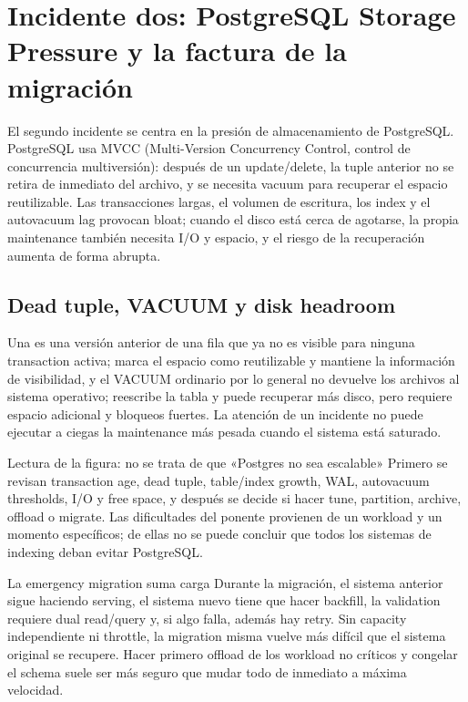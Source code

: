 \section{Incidente dos: PostgreSQL Storage Pressure y la factura de la migración}

El segundo incidente se centra en la presión de almacenamiento de PostgreSQL. PostgreSQL usa MVCC (Multi-Version Concurrency Control, control de concurrencia multiversión): después de un update/delete, la tuple anterior no se retira de inmediato del archivo, y se necesita vacuum para recuperar el espacio reutilizable. Las transacciones largas, el volumen de escritura, los index y el autovacuum lag provocan bloat; cuando el disco está cerca de agotarse, la propia maintenance también necesita I/O y espacio, y el riesgo de la recuperación aumenta de forma abrupta.

\subsection{Dead tuple, VACUUM y disk headroom}

Una  es una versión anterior de una fila que ya no es visible para ninguna transaction activa;  marca el espacio como reutilizable y mantiene la información de visibilidad, y el VACUUM ordinario por lo general no devuelve los archivos al sistema operativo;  reescribe la tabla y puede recuperar más disco, pero requiere espacio adicional y bloqueos fuertes. La atención de un incidente no puede ejecutar a ciegas la maintenance más pesada cuando el sistema está saturado.


\begin{knowledgebox}{Lectura de la figura: no se trata de que «Postgres no sea escalable»}
Primero se revisan transaction age, dead tuple, table/index growth, WAL, autovacuum thresholds, I/O y free space, y después se decide si hacer tune, partition, archive, offload o migrate. Las dificultades del ponente provienen de un workload y un momento específicos; de ellas no se puede concluir que todos los sistemas de indexing deban evitar PostgreSQL.
\end{knowledgebox}

\begin{warningbox}{La emergency migration suma carga}
Durante la migración, el sistema anterior sigue haciendo serving, el sistema nuevo tiene que hacer backfill, la validation requiere dual read/query y, si algo falla, además hay retry. Sin capacity independiente ni throttle, la migration misma vuelve más difícil que el sistema original se recupere. Hacer primero offload de los workload no críticos y congelar el schema suele ser más seguro que mudar todo de inmediato a máxima velocidad.
\end{warningbox}


